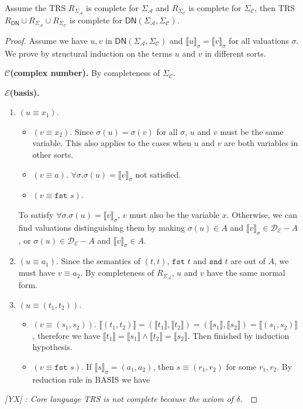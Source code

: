 \documentclass[manuscript, review, timestamp]{acmart}
\newcommand{\yx}[1]{\textit{\color{blue}[YX] : #1}}
\newcommand*{\fst}{\texttt{fst }}
\newcommand*{\snd}{\texttt{snd }}
\newcommand*{\sem}[1]{{\llbracket #1 \rrbracket}}
\begin{document}
\begin{theorem}
  Assume the TRS $R_{\Sigma_\mathcal{A}}$ is complete for $\Sigma_\mathcal{A}$ and $R_{\Sigma_\mathcal{C}}$ is complete for $\Sigma_\mathcal{C}$, then TRS $R_\textsf{DN}\cup R_{\Sigma_\mathcal{A}} \cup R_{\Sigma_\mathcal{C}}$ is complete for $\textsf{DN}(\Sigma_\mathcal{A}, \Sigma_\mathcal{C})$.
\end{theorem}
\begin{proof}
  Assume we have $u, v$ in $\textsf{DN}(\Sigma_\mathcal{A}, \Sigma_\mathcal{C})$ and $\sem{u}_\sigma = \sem{v}_\sigma$ for all valuations $\sigma$. 
  We prove by structural induction on the terms $u$ and $v$ in different sorts.
  
  \textbf{$\mathcal{C}$(complex number).} By completeness of $\Sigma_\mathcal{C}$.

  \textbf{$\mathcal{E}$(basis).} 
   
  \begin{enumerate}
    \item $(u \equiv x_1)$. 
    \begin{itemize}
      \item $(v \equiv x_2)$. Since $\sigma(u) = \sigma(v)$ for all $\sigma$, $u$ and $v$ must be the same variable. This also applies to the cases when $u$ and $v$ are both variables in other sorts.
      \item $(v \equiv a)$. $\forall \sigma. \sigma(u) = \sem{v}_\sigma$ not satisfied.
      \item $(v \equiv \fst s)$. 
    \end{itemize}
    To satisfy $\forall \sigma. \sigma(u) = \sem{v}_\sigma$, $v$ must also be the variable $x$. Otherwise, we can find valuations distinguishing them by making $\sigma(u) \in A$ and $\sem{v}_\sigma \in \mathcal{D}_{\mathcal{E}} - A$, or $\sigma(u) \in \mathcal{D}_{\mathcal{E}} - A$ and $\sem{v}_\sigma \in A$.
    \item $(u \equiv a_1)$. Since the semantics of $(t, t)$, $\fst t$ and $\snd t$ are out of $A$, we must have $v \equiv a_2$. By completeness of $R_{\Sigma_\mathcal{A}}$, $u$ and $v$ have the same normal form.
    \item $(u \equiv (t_1, t_2))$. 
      \begin{itemize}
        \item $(v \equiv (s_1, s_2))$. $\sem{(t_1, t_2)} = (\sem{t_1}, \sem{t_2}) = (\sem{s_1}, \sem{s_2}) = \sem{(s_1, s_2)}$, therefore we have $\sem{t_1} = \sem{s_1} \wedge \sem{t_2} = \sem{s_2}$. Then finished by induction hypothesis.
        \item $(v \equiv \fst s)$. If $\sem{s}_\sigma = (a_1, a_2)$, then $s \equiv (r_1, r_2)$ for some $r_1, r_2$. By reduction rule in \textsc{BASIS} we have 
      \end{itemize}
  \end{enumerate}

  \yx{Core language TRS is not complete because the axiom of $\delta$.}\

\end{proof}
\end{document}
